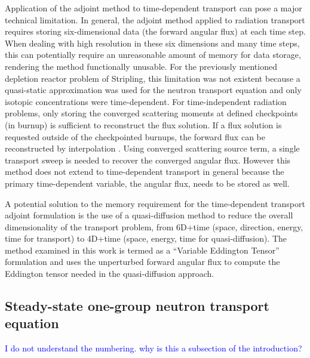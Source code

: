 \documentclass[12pt]{report}
\newcommand{\comment}[2]{\marginpar{\textcolor{#2}{$\star$}}\textcolor{#2}{#1}\newline}
\newcommand{\jcr}[1]{\comment{#1}{blue}}
\newcommand{\jcr}[1]{\phantom{a}}
\begin{document}
Application of the adjoint method to time-dependent transport can pose a major technical limitation. In general, the adjoint method applied to radiation transport requires storing six-dimensional data (the forward angular flux) at each time step. When dealing with high resolution in these six dimensions and many time steps, this can potentially require an unreasonable amount of memory for data storage, rendering the method functionally unusable. For the previously mentioned depletion reactor problem of Stripling, this limitation was not existent because a quasi-static approximation was used for the neutron transport equation and only isotopic concentrations were time-dependent. For time-independent radiation problems, only storing the converged scattering moments at defined checkpoints (in burnup) is sufficient to reconstruct the flux solution. If a flux solution is requested outside of the checkpointed burnups, the forward flux can be reconstructed by interpolation \cite{Stripling}.
Using converged scattering source term, a single transport sweep is needed to recover the converged
angular flux. However this method does not extend to time-dependent transport in general because
the primary time-dependent variable, the angular flux, needs to be stored as well. 

A potential solution to the memory requirement for the time-dependent transport adjoint formulation is the use of a quasi-diffusion method to reduce the overall dimensionality of the transport problem, from 6D+time (space, direction, energy, time for transport) to 4D+time (space, energy, time for quasi-diffusion). The method examined in this work is termed  as a ``Variable Eddington Tensor'' formulation and uses the unperturbed forward angular flux to compute the Eddington tensor needed in the quasi-diffusion approach.


\subsection{Steady-state one-group neutron transport equation}
\jcr{I do not understand the numbering. why is this a subsection of the introduction?}
\end{document}
